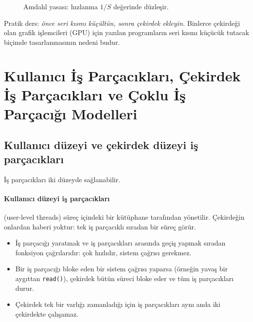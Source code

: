\documentclass[11pt,a4paper]{article}
\newcommand{\cmd}[1]{\texttt{#1}}
\begin{document}
\begin{figure}[H]
\centering
{}
\caption{Amdahl yasası: hızlanma $1/S$ değerinde düzleşir.}
\end{figure}

Pratik ders: \emph{önce seri kısmı küçültün, sonra çekirdek ekleyin.} Binlerce çekirdeği olan grafik işlemcileri (GPU) için yazılan programların seri kısmı küçücük tutacak biçimde tasarlanmasının nedeni budur.

\section{Kullanıcı İş Parçacıkları, Çekirdek İş Parçacıkları ve Çoklu İş Parçacığı Modelleri}

\subsection{Kullanıcı düzeyi ve çekirdek düzeyi iş parçacıkları}

İş parçacıkları iki düzeyde sağlanabilir.

\paragraph{Kullanıcı düzeyi iş parçacıkları} (user-level threads) süreç içindeki bir kütüphane tarafından yönetilir. Çekirdeğin onlardan haberi yoktur: tek iş parçacıklı sıradan bir süreç görür.
\begin{itemize}
  \item[\textcolor{mintdeep}{$+$}] İş parçacığı yaratmak ve iş parçacıkları arasında geçiş yapmak sıradan fonksiyon çağrılarıdır: çok hızlıdır, sistem çağrısı gerekmez.
  \item[\textcolor{red!60!black}{$-$}] Bir iş parçacığı bloke eden bir sistem çağrısı yaparsa (örneğin yavaş bir aygıttan \cmd{read()}), çekirdek bütün süreci bloke eder ve tüm iş parçacıkları durur.
  \item[\textcolor{red!60!black}{$-$}] Çekirdek tek bir varlığı zamanladığı için iş parçacıkları aynı anda iki çekirdekte çalışamaz.
\end{itemize}
\end{document}
